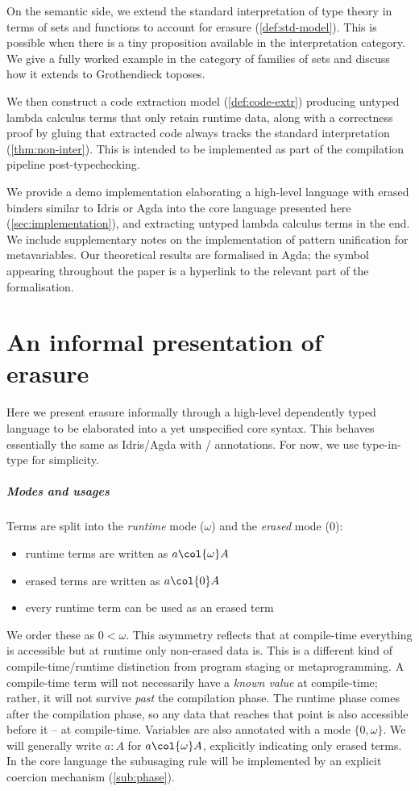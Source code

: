 On the semantic side, we extend the standard interpretation of type theory in
terms of sets and functions to account for erasure (\cref{def:std-model}). This
is possible when there is a tiny proposition available in the interpretation
category. We give a fully worked example in the category of families of sets
and discuss how it extends to Grothendieck toposes.

We then construct a code extraction model (\cref{def:code-extr}) producing
untyped lambda calculus terms that only retain runtime data, along with a
correctness proof by gluing that extracted code always tracks the standard
interpretation (\cref{thm:non-inter}). This is intended to be implemented as
part of the compilation pipeline post-typechecking.

We provide a demo implementation elaborating a high-level language with erased
binders similar to Idris or Agda into the core language presented here
(\cref{sec:implementation}), and extracting untyped lambda calculus terms in the
end. We include supplementary notes on the implementation of pattern unification
for metavariables. Our theoretical results are formalised in Agda; the symbol
 appearing throughout
the paper is a hyperlink to the relevant part of the formalisation.

\section{An informal presentation of erasure} \label{sec:informal-itt}

Here we present erasure informally through a high-level dependently typed
language to be elaborated into a yet unspecified core syntax. This behaves
essentially the same as Idris/Agda with / annotations. For now, we
use type-in-type for simplicity.

\subparagraph{Modes and usages}

Terms are split into the \emph{runtime} mode ($\omega$) and the
\emph{erased} mode ($0$):
\begin{itemize}
    \item runtime terms are written as $a \col{\omega} A$
    \item erased terms are written as $a \col{0} A$
    \item every runtime term can be used as an erased term
\end{itemize}
We order these as $0 < \omega$. This asymmetry reflects that at compile-time
everything is accessible but at runtime only non-erased data is. This is a
different kind of compile-time/runtime distinction from program staging or
metaprogramming. A compile-time term will not necessarily have a \emph{known
value} at compile-time; rather, it will not survive \emph{past} the compilation
phase. The runtime phase comes after the compilation phase, so any data that
reaches that point is also accessible before it -- at compile-time. Variables
are also annotated with a mode $\{0, \omega\}$. We will generally write $a : A$
for $a \col{\omega} A$, explicitly indicating only erased terms. In the core
language the subusaging rule will be implemented by an explicit coercion
mechanism (\cref{sub:phase}).

